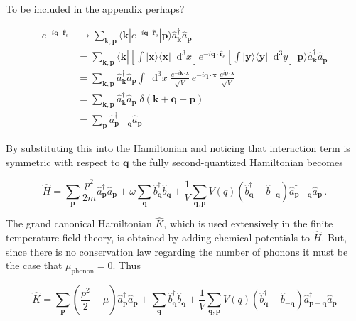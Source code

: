 \documentclass[12pt]{report}
\renewcommand{\vec}[1]{\boldsymbol{\mathbf{#1}}}                        %
\newcommand*\diff{\mathop{}\!\mathrm{d}}
\newcommand{\motivation}[1]{{\leavevmode\color{motivation}#1}}
\begin{document}
\motivation{
To be included in the appendix perhaps?

\begin{equation}
	\begin{split}
		e^{-i \vec q \cdot \hat{ \vec r}_\text{e}}
		& \rightarrow \sum_{\vec k, \vec p} \langle \vec k | e^{-i \vec q \cdot \hat{ \vec r}_\text{e}} | \vec p \rangle \hat a^\dagger_{\vec k} \hat a_{\vec p} \\
		& = \sum_{\vec k, \vec p} \langle \vec k |
			\left[ \int | \vec x \rangle \langle \vec x | \diff^3 x \right]
			e^{-i \vec q \cdot \hat{ \vec r}_\text{e}}
			\left[ \int | \vec y \rangle \langle \vec y | \diff^3 y \right]
			| \vec p \rangle \hat a^\dagger_{\vec k} \hat a_{\vec p} \\
		& = \sum_{\vec k, \vec p} \hat a^\dagger_{\vec k} \hat a_{\vec p}
			\int \diff^3 x \;
			\frac{e^{- i \vec k \cdot \vec x}}{\sqrt{V}} \,
			e^{-i \vec q \cdot \vec x} \,
			 \frac{e^{i \vec p \cdot \vec x}}{\sqrt{V}} \\
		& = \sum_{\vec k, \vec p} \hat a^\dagger_{\vec k} \hat a_{\vec p}
			\; \delta( \vec k + \vec q - \vec p) \\
		& = \sum_{\vec p} \hat a^\dagger_{\vec p - \vec q} \hat a_{\vec p}
	\end{split}
\end{equation}
}

By substituting this into the Hamiltonian and noticing that interaction term is symmetric with respect to $ \vec q $ the fully second-quantized Hamiltonian becomes

\begin{equation}
	\label{eq:finalHamiltonian}
	\hat H
	= \sum_{\vec p} \frac{p^2}{2m} \hat a^\dagger_{\vec p} \hat a_{\vec p}
	+ \omega \sum_{\vec q} \hat b^\dagger_{\vec q} \hat b_{\vec q}
	+ \frac{1}{V} \sum_{\vec q, \vec p} V (q) \left( \hat b^\dagger_{\vec q} - \hat b_{- \vec q} \right) \hat a^\dagger_{\vec p - \vec q} \hat a_{\vec p} \,.
\end{equation}

The grand canonical Hamiltonian $ \hat K $, which is used extensively in the finite temperature field theory, is obtained by adding chemical potentials to $ \hat H $. But, since there is no conservation law regarding the number of phonons it must be the case that $ \mu_\text{phonon} = 0 $. Thus

\begin{equation}
	\label{eq:finalGrandCanoniclaHamiltonian}
	\hat K
	= \sum_{\vec p} \left( \frac{p^2}{2} - \mu \right) \hat a^\dagger_{\vec p} \hat a_{\vec p}
	+ \sum_{\vec q} \hat b^\dagger_{\vec q} \hat b_{\vec q}
	+ \frac{1}{V} \sum_{\vec q, \vec p} V (q) \left( \hat b^\dagger_{\vec q} - \hat b_{- \vec q} \right) \hat a^\dagger_{\vec p - \vec q} \hat a_{\vec p}
\end{equation}
\end{document}
